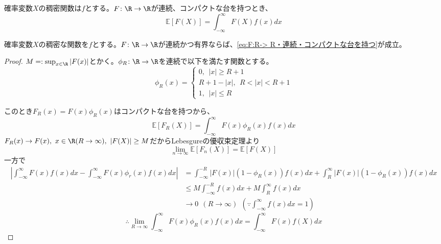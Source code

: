 
    確率変数$X$の稠密関数は$f$とする。$F\colon \R\to \R$が連続、コンパクトな台を持つとき、
\begin{equation} \label{eq:F:R-> R・連続・コンパクトな台を持つ}
    \mathbb{E}[F(X)]= \int_{-\infty}^\infty F(X) f(x)dx
\end{equation}

    確率変数$X$の稠密な関数を$f$とする。$F\colon \R\to \R$が連続かつ有界ならば、\eqref{eq:F:R-> R・連続・コンパクトな台を持つ}が成立。
\begin{proof}
    $M=:\sup_{x\in \R} |F(x)|$とかく。$\phi_R\colon \R\to \R$を連続で以下を満たす関数とする。
\begin{equation}
    \phi_R(x) 
    = 
\begin{cases}
    0,\ \ |x|\ge R+ 1\\
    R+ 1- |x|,\ \ R< |x|< R+ 1\\
    1,\ \ |x|\le R
\end{cases}
\end{equation}
\begin{tikzpicture}
\end{tikzpicture}
    このとき$F_R(x)= F(x)\phi_R(x)$はコンパクトな台を持つから、
\begin{equation}
    \mathbb{E}[F_R(X)]= \int_{-\infty}^\infty F(x)\phi_R(x)f(x)dx
\end{equation}
    $F_R(x)\to F(x),\ x\in \R(R\to \infty),\ |F(X)|\ge M$だからLebesgureの優収束定理より
\begin{equation}
    \lim_{n\to \infty}\mathbb{E}[F_n(X)]= \mathbb{E}[F(X)]
\end{equation}
    一方で
\begin{align}
    \left|\int_{-\infty}^\infty F(x)f(x)dx- \int_{-\infty}^\infty F(x)\phi_r(x)f(x)dx\right|
    &= \int_{-\infty}^{-R}|F(x)|(1- \phi_R(x))f(x)dx+ \int_R^\infty |F(x)|(1- \phi_R(x))f(x)dx\\
    &\le M\int_{-\infty}^{-R} f(x)dx+ M\int_R^\infty f(x)dx\\
    &\to 0\ \ (R\to \infty)\ \ \left(\because \int_{-\infty}^\infty f(x)dx= 1\right)
\end{align}
\begin{equation}
    \therefore \lim_{R\to \infty}\int_{-\infty}^\infty F(x)\phi_R(x)f(x)dx= \int_{-\infty}^\infty F(x)f(X)dx
\end{equation}
\end{proof}

